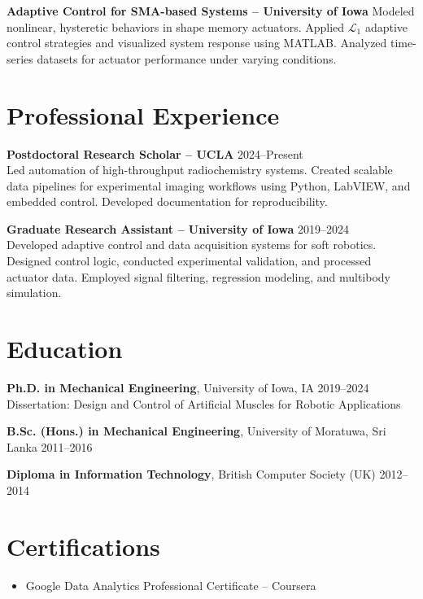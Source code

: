 \documentclass[letterpaper,10pt]{article}
\begin{document}
\textbf{Adaptive Control for SMA-based Systems – University of Iowa}  
Modeled nonlinear, hysteretic behaviors in shape memory actuators. Applied $\mathcal{L}_1$ adaptive control strategies and visualized system response using MATLAB. Analyzed time-series datasets for actuator performance under varying conditions.


\section*{Professional Experience \hrulefill}
\textbf{Postdoctoral Research Scholar – UCLA} \hfill 2024–Present \\
Led automation of high-throughput radiochemistry systems. Created scalable data pipelines for experimental imaging workflows using Python, LabVIEW, and embedded control. Developed documentation for reproducibility.

\textbf{Graduate Research Assistant – University of Iowa} \hfill 2019–2024 \\
Developed adaptive control and data acquisition systems for soft robotics. Designed control logic, conducted experimental validation, and processed actuator data. Employed signal filtering, regression modeling, and multibody simulation.

\section*{Education \hrulefill}
\textbf{Ph.D. in Mechanical Engineering}, University of Iowa, IA \hfill 2019--2024\\
Dissertation: Design and Control of Artificial Muscles for Robotic Applications%

\textbf{B.Sc. (Hons.) in Mechanical Engineering}, University of Moratuwa, Sri Lanka \hfill 2011--2016

\textbf{Diploma in Information Technology}, British Computer Society (UK) \hfill 2012--2014 
\section*{Certifications \hrulefill}
\begin{itemize}[leftmargin=1em]
  \item Google Data Analytics Professional Certificate – Coursera
\end{itemize}
\end{document}
